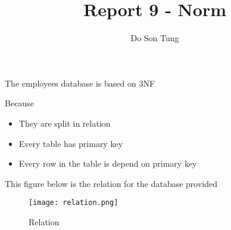 \documentclass[12pt]{article}
\title{Report 9 - Norm}
\author{Do Son Tung}
\date{} %
\begin{document}
\maketitle

The employees database is based on 3NF

Because 

\begin{itemize}
\item They are split in relation
\item Every table has primary key
\item Every row in the table is depend on primary key
\end{itemize}

\newpage

This figure below is the relation for the database provided

\begin{figure}[H]
  \texttt{[image: relation.png]}
  \caption{Relation}
  \label{fig:relation}
\end{figure}
\end{document}
